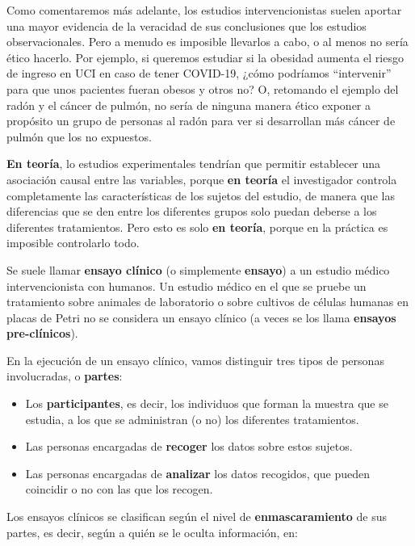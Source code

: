 \documentclass[
]{book}
\providecommand{\tightlist}{%
  \setlength{\itemsep}{0pt}\setlength{\parskip}{0pt}}
\theoremstyle{definition}
\theoremstyle{definition}
\theoremstyle{definition}
\theoremstyle{definition}
\theoremstyle{remark}
\begin{document}
Como comentaremos más adelante, los estudios intervencionistas suelen aportar una mayor evidencia de la veracidad de sus conclusiones que los estudios observacionales. Pero a menudo es imposible llevarlos a cabo, o al menos no sería ético hacerlo. Por ejemplo, si queremos estudiar si la obesidad aumenta el riesgo de ingreso en UCI en caso de tener COVID-19, ¿cómo podríamos ``intervenir'' para que unos pacientes fueran obesos y otros no? O, retomando el ejemplo del radón y el cáncer de pulmón, no sería de ninguna manera ético exponer a propósito un grupo de personas al radón para ver si desarrollan más cáncer de pulmón que los no expuestos.

\begin{rmdnote}
\textbf{En teoría}, lo estudios experimentales tendrían que permitir establecer una asociación causal entre las variables, porque \textbf{en teoría} el investigador controla completamente las características de los sujetos del estudio, de manera que las diferencias que se den entre los diferentes grupos solo puedan deberse a los diferentes tratamientos. Pero esto es solo \textbf{en teoría}, porque en la práctica es imposible controlarlo todo.
\end{rmdnote}

Se suele llamar \textbf{ensayo clínico} (o simplemente \textbf{ensayo}) a un estudio médico intervencionista con humanos. Un estudio médico en el que se pruebe un tratamiento sobre animales de laboratorio o sobre cultivos de células humanas en placas de Petri no se considera un ensayo clínico (a veces se los llama \textbf{ensayos pre-clínicos}).

En la ejecución de un ensayo clínico, vamos distinguir tres tipos de personas involucradas, o \textbf{partes}:

\begin{itemize}
\tightlist
\item
  Los \textbf{participantes}, es decir, los individuos que forman la muestra que se estudia, a los que se administran (o no) los diferentes tratamientos.
\item
  Las personas encargadas de \textbf{recoger} los datos sobre estos sujetos.
\item
  Las personas encargadas de \textbf{analizar} los datos recogidos, que pueden coincidir o no con las que los recogen.
\end{itemize}

Los ensayos clínicos se clasifican según el nivel de \textbf{enmascaramiento} de sus partes, es decir, según a quién se le oculta información, en:
\end{document}
